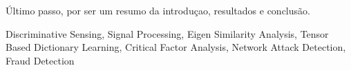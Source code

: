 Último passo, por ser um resumo da introduçao, resultados e conclusão.

\begin{keywords}
Discriminative Sensing, Signal Processing, Eigen Similarity Analysis, Tensor Based Dictionary Learning, Critical Factor Analysis, Network Attack Detection, Fraud Detection
\end{keywords}
